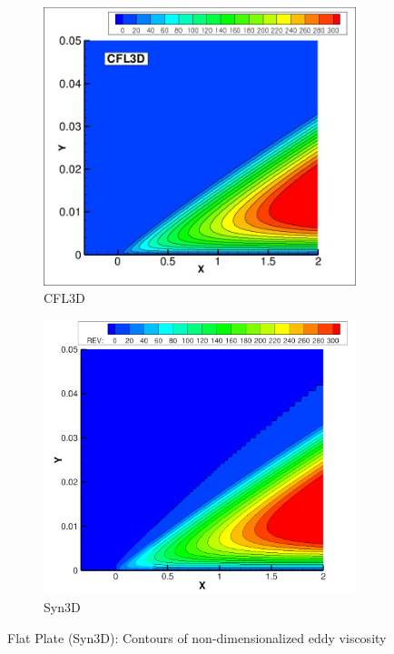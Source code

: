 \begin{figure}[ht!]
\centering
\begin{subfigure}{.45\textwidth}
  \centering
  \includegraphics[width=1.0\textwidth]{figs/flat/mut_contours_cfl3d.jpg}
  \caption{CFL3D}
\end{subfigure}%
\begin{subfigure}{.45\textwidth}
  \centering
  \includegraphics[width=1.0\textwidth]{figs/flat/rev_sa.png}
  \caption{Syn3D}
\end{subfigure}
\caption{Flat Plate (Syn3D): Contours of non-dimensionalized eddy viscosity}
\label{fig:synflatmutcontour}
\end{figure}

